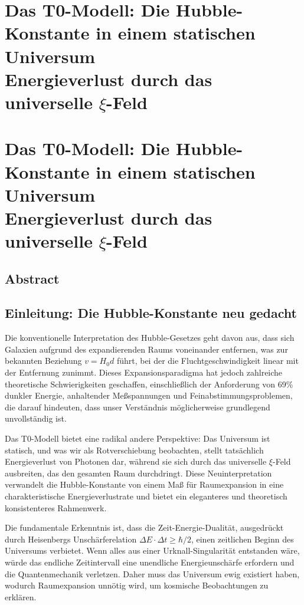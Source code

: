 \chapter{Das T0-Modell: Die Hubble-Konstante in einem statischen Universum \\
		Energieverlust durch das universelle $\xi$-Feld}


	\chapter{Das T0-Modell: Die Hubble-Konstante in einem statischen Universum \\
		Energieverlust durch das universelle $\xi$-Feld}
	\author{Johann Pascher}
	\date{Januar 2025}
	
	
\section*{Abstract}

	
	
	\section{Einleitung: Die Hubble-Konstante neu gedacht}
	
	Die konventionelle Interpretation des Hubble-Gesetzes geht davon aus, dass sich Galaxien aufgrund des expandierenden Raums voneinander entfernen, was zur bekannten Beziehung $v = H_0 d$ führt, bei der die Fluchtgeschwindigkeit linear mit der Entfernung zunimmt. Dieses Expansionsparadigma hat jedoch zahlreiche theoretische Schwierigkeiten geschaffen, einschließlich der Anforderung von 69\% dunkler Energie, anhaltender Meßspannungen und Feinabstimmungsproblemen, die darauf hindeuten, dass unser Verständnis möglicherweise grundlegend unvollständig ist.
	
	Das T0-Modell bietet eine radikal andere Perspektive: Das Universum ist statisch, und was wir als Rotverschiebung beobachten, stellt tatsächlich Energieverlust von Photonen dar, während sie sich durch das universelle $\xi$-Feld ausbreiten, das den gesamten Raum durchdringt. Diese Neuinterpretation verwandelt die Hubble-Konstante von einem Maß für Raumexpansion in eine charakteristische Energieverlustrate und bietet ein eleganteres und theoretisch konsistenteres Rahmenwerk.
	
	\begin{revolutionary}
	\end{revolutionary}
	
	Die fundamentale Erkenntnis ist, dass die Zeit-Energie-Dualität, ausgedrückt durch Heisenbergs Unschärferelation $\Delta E \cdot \Delta t \geq \hbar/2$, einen zeitlichen Beginn des Universums verbietet. Wenn alles aus einer Urknall-Singularität entstanden wäre, würde das endliche Zeitintervall eine unendliche Energieunschärfe erfordern und die Quantenmechanik verletzen. Daher muss das Universum ewig existiert haben, wodurch Raumexpansion unnötig wird, um kosmische Beobachtungen zu erklären.
	
